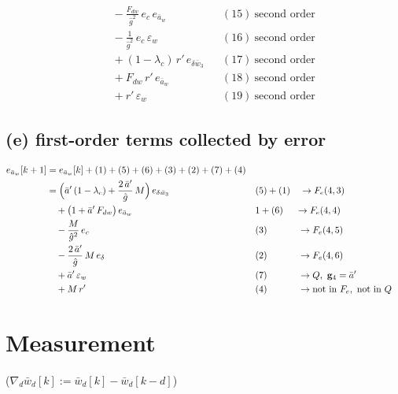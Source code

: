 \documentclass[11pt,a4paper,fontset=none]{ctexart}
\newcommand{\ba}{\bar{a}}
\newcommand{\bw}{\bar{w}}
\newcommand{\ap}{\ba'}
\newcommand{\dl}{\delta}
\newcommand{\gh}{\hat{g}}
\begin{document}
\begin{align*}
  &\quad - \frac{F_{dw}}{\gh^{2}}\,e_c\,e_{\ba_w}                                 && (15)\ \text{second order} \\
  &\quad - \frac{1}{\gh^{2}}\,e_c\,\varepsilon_w                                  && (16)\ \text{second order} \\
  &\quad + (1-\lambda_c)\,r'\,e_{\delta\bw_3}                                     && (17)\ \text{second order} \\
  &\quad + F_{dw}\,r'\,e_{\ba_w}                                                  && (18)\ \text{second order} \\
  &\quad + r'\,\varepsilon_w                                                      && (19)\ \text{second order}
\end{align*}

\subsection*{(e) first-order terms collected by error}

\begin{align*}
e_{\ba_w}[k+1]
  &= e_{\ba_w}[k] + (1) + (5) + (6) + (3) + (2) + (7) + (4) \\
  &= \Bigl(\ap\,(1-\lambda_c) + \frac{2\,\ap}{\gh}\,M\Bigr)\,e_{\delta\bw_3}      && (5) + (1) \quad \to F_e(4,3) \\
  &\quad + \bigl(1 + \ap\,F_{dw}\bigr)\,e_{\ba_w}                                 && 1 + (6) \quad\ \to F_e(4,4) \\
  &\quad - \frac{M}{\gh^{2}}\,e_c                                                 && (3) \qquad\quad\ \to F_e(4,5) \\
  &\quad - \frac{2\,\ap}{\gh}\,M\,e_{\dl}                                         && (2) \qquad\quad\ \to F_e(4,6) \\
  &\quad + \ap\,\varepsilon_w                                                     && (7) \qquad\quad\ \to Q,\ \mathbf{g}_4 = \ap \\
  &\quad + M\,r'                                                                  && (4) \qquad\quad\ \to \text{not in } F_e,\ \text{not in } Q
\end{align*}

\newpage
\section{Measurement}

($\nabla_d\bw_d[k] := \bw_d[k] - \bw_d[k-d]$)
\end{document}
